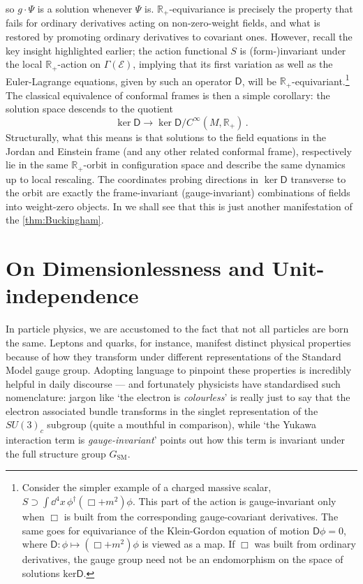 \documentclass[12pt]{article}
\numberwithin{equation}{section}
\newcommand{\R}{\mathbb{R}}
\begin{document}
so $g\cdot \Psi$ is a solution whenever $\Psi$ is. $\R_+$-equivariance is precisely the property that fails for ordinary derivatives acting on non-zero-weight fields, and what is restored by promoting ordinary derivatives to covariant ones. However, recall the key insight highlighted earlier; the action functional $S$ is \mbox{(form-)invariant} under the local $\R_+$-action on $\Gamma(\mathcal{E})$, implying that its first variation as well as the Euler-Lagrange equations, given by such an operator $\mathsf{D}$, will be $\R_+$-equivariant.\footnote{Consider the simpler example of a charged massive scalar, $S\supset \int \dd^4x\,\phi^\dagger(\Box+m^2)\phi$. This part of the action is gauge-invariant only when $\Box$ is built from the corresponding gauge-covariant derivatives. The same goes for equivariance of the Klein-Gordon equation of motion $\mathsf{D}\phi=0$, where ${\mathsf{D}\colon \phi\mapsto (\Box+m^2)\phi}$ is viewed as a map. If $\Box$ was built from ordinary derivatives, the gauge group need not be an endomorphism on the space of solutions $\mathrm{ker}\mathsf{D}$.} The classical equivalence of conformal frames is then a simple corollary: the solution space descends to the quotient 
\begin{equation}
    \ker\mathsf{D}\longrightarrow\ker \mathsf{D}\slash C^\infty(M,\R_+)\,.
\end{equation}
Structurally, what this means is that solutions to the field equations in the Jordan and Einstein frame (and any other related conformal frame), respectively lie in the same $\R_+$-orbit in configuration space and describe the same dynamics up to local rescaling. The coordinates probing directions in $\ker \mathsf{D}$ transverse to the orbit are exactly the frame-invariant (gauge-invariant) combinations of fields into weight-zero objects. In  we shall see that this is just another manifestation of the \cref{thm:Buckingham}.

\section{On Dimensionlessness and Unit-independence}\label{sec:dimensionless}
In particle physics, we are accustomed to the fact that not all particles are born the same. Leptons and quarks, for instance, manifest distinct physical properties because of how they transform under different representations of the Standard Model gauge group. Adopting language to pinpoint these properties is incredibly helpful in daily discourse --- and fortunately physicists have standardised such nomenclature: jargon like `the electron is \emph{colourless}' is really just to say that the electron associated bundle transforms in the singlet representation of the $SU(3)_c$ subgroup (quite a mouthful in comparison), while `the Yukawa interaction term is \emph{gauge-invariant}' points out how this term is invariant under the full structure group $G_\text{SM}$. 
\end{document}
